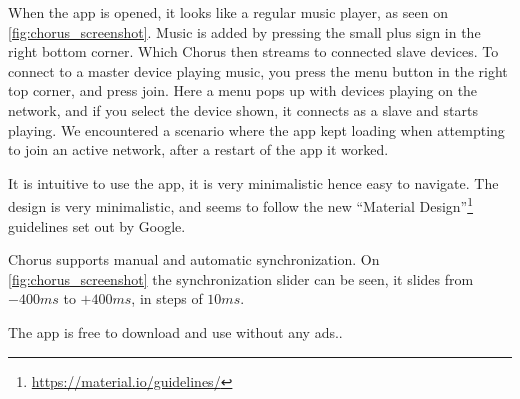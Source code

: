 When the app is opened, it looks like a regular music player, as seen on \cref{fig:chorus_screenshot}.
Music is added by pressing the small plus sign in the right bottom corner.
Which Chorus then streams to connected slave devices.
To connect to a master device playing music, you press the menu button in the right top corner, and press join.
Here a menu pops up with devices playing on the network, and if you select the device shown, it connects as a slave and starts playing.
We encountered a scenario where the app kept loading when attempting to join an active network, after a restart of the app it worked.

It is intuitive to use the app, it is very minimalistic hence easy to navigate.
The design is very minimalistic, and seems to follow the new ``Material Design''\footnote{\url{https://material.io/guidelines/}} guidelines set out by Google.

Chorus supports manual and automatic synchronization.
On \cref{fig:chorus_screenshot} the synchronization slider can be seen,
it slides from $-400ms$ to $+400ms$, in steps of $10 ms$.

The app is free to download and use without any ads.\cite{chrous_play}.

